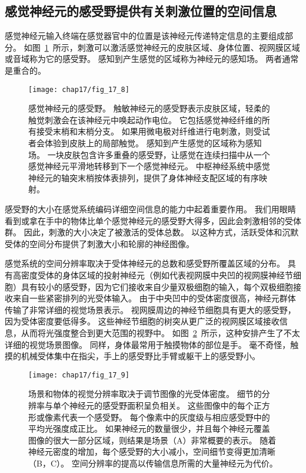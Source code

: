 \subsection{感觉神经元的感受野提供有关刺激位置的空间信息}

感觉神经元输入终端在感觉器官中的位置是该神经元传递特定信息的主要组成部分。
如图~\ref{fig:17_8}~所示，刺激可以激活感觉神经元的皮肤区域、身体位置、视网膜区域或音域称为它的感受野。
感知到产生感觉的区域称为神经元的感知场。
两者通常是重合的。


\begin{figure}[htbp]
	\centering
	\texttt{[image: chap17/fig\_17\_8]}
	\caption{感觉神经元的感受野。
		触敏神经元的感受野表示皮肤区域，轻柔的触觉刺激会在该神经元中唤起动作电位。
		它包括感觉神经纤维的所有接受末梢和末梢分支。
		如果用微电极对纤维进行电刺激，则受试者会体验到皮肤上的局部触觉。
		感知到产生感觉的区域称为感知场。
		一块皮肤包含许多重叠的感受野，让感觉在连续扫描中从一个感觉神经元平滑地转移到下一个感觉神经元。
		中枢神经系统中感觉神经元的轴突末梢按体表排列，提供了身体神经支配区域的有序映射。}
	\label{fig:17_8}
\end{figure}

感受野的大小在感觉系统编码详细空间信息的能力中起着重要作用。 
我们用眼睛看到或拿在手中的物体比单个感觉神经元的感受野大得多，因此会刺激相邻的受体群。
因此，刺激的大小决定了被激活的受体总数。
以这种方式，活跃受体和沉默受体的空间分布提供了刺激大小和轮廓的神经图像。


感觉系统的空间分辨率取决于受体神经元的总数和感受野所覆盖区域的分布。
具有高密度受体的身体区域的投射神经元（例如代表视网膜中央凹的视网膜神经节细胞）具有较小的感受野，因为它们接收来自少量双极细胞的输入，每个双极细胞接收来自一些紧密排列的光受体输入。
由于中央凹中的受体密度很高，神经元群体传输了非常详细的视觉场景表示。
视网膜周边的神经节细胞具有更大的感受野，因为受体密度要低得多。
这些神经节细胞的树突从更广泛的视网膜区域接收信息，从而将光强度整合到更大范围的视野中。
如图~\ref{fig:17_9}~所示，这种安排产生了不太详细的视觉场景图像。
同样，身体最常用于触摸物体的部位是手。
毫不奇怪，触摸的机械受体集中在指尖，手上的感受野比手臂或躯干上的感受野小。


\begin{figure}[htbp]
	\centering
	\texttt{[image: chap17/fig\_17\_9]}
	\caption{场景和物体的视觉分辨率取决于调节图像的光受体密度。
		细节的分辨率与单个神经元的感受野面积呈负相关。
		这些图像中的每个正方形或像素代表一个感受野。
		每个像素中的灰度级与相应感受野中的平均光强度成正比。
		如果神经元的数量很少，并且每个神经元覆盖图像的很大一部分区域，则结果是场景（A）非常概要的表示。
		随着神经元密度的增加，每个感受野的大小减小，空间细节变得更加清晰（B，C）。
		空间分辨率的提高以传输信息所需的大量神经元为代价。}
	\label{fig:17_9}
\end{figure}




